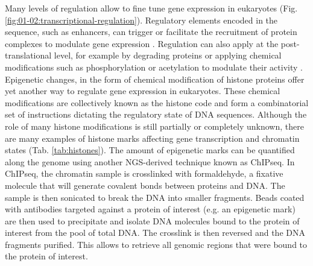 Many levels of regulation allow to fine tune gene expression in eukaryotes (Fig. \ref{fig:01-02:transcriptional-regulation}). Regulatory elements encoded in the sequence, such as enhancers, can trigger or facilitate the recruitment of protein complexes to modulate gene expression \cite{levoPursuitDesignPrinciples2014}. Regulation can also apply at the post-translational level, for example by degrading proteins \cite{brownSREBPPathwayRegulation1997} or applying chemical modifications such as phosphorylation or acetylation to modulate their activity \cite{christensenPosttranslationalProteinAcetylation2019}. Epigenetic changes, in the form of chemical modification of histone proteins offer yet another way to regulate gene expression in eukaryotes. These chemical modifications are collectively known as the histone code and form a combinatorial set of instructions dictating the regulatory state of DNA sequences. Although the role of many histone modifications is still partially or completely unknown, there are many examples of histone marks affecting gene transcription and chromatin states (Tab. \ref{tab:histones}). The amount of epigenetic marks can be quantified along the genome using another NGS-derived technique known as \acrfull{ChIPseq}. In \acrshort{ChIPseq}, the chromatin sample is crosslinked with formaldehyde, a fixative molecule that will generate covalent bonds between proteins and DNA. The sample is then sonicated to break the DNA into smaller fragments. Beads coated with antibodies targeted against a protein of interest (e.g. an epigenetic mark) are then used to precipitate and isolate DNA molecules bound to the protein of interest from the pool of total DNA. The crosslink is then reversed and the DNA fragments purified. This allows to retrieve all genomic regions that were bound to the protein of interest. 

